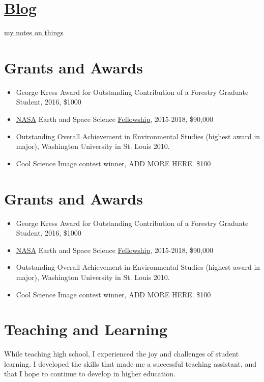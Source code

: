 \documentclass{article}
\begin{document}
\section*{\href{blog.html}{Blog}}
\label{sec:org2245daf}

\href{blog.html}{my notes on things}



\section*{Grants and Awards}
\label{sec:org26c79c4}
\begin{itemize}
\item George Kress Award for Outstanding Contribution of a Forestry Graduate
Student, 2016, \$1000
\item \href{https://www.nasa.gov/multimedia/imagegallery/iotd.html}{NASA} Earth and Space Science \href{data/NESSF15_selections.pdf}{Fellowship}, 2015-2018, \$90,000
\item Outstanding Overall Achievement in Environmental Studies (highest award in major), Washington University in St. Louis 2010.
\item Cool Science Image contest winner, ADD MORE HERE. \$100
\end{itemize}
\section*{Grants and Awards}
\label{sec:orgb8a4943}
\begin{itemize}
\item George Kress Award for Outstanding Contribution of a Forestry Graduate
Student, 2016, \$1000
\item \href{https://www.nasa.gov/multimedia/imagegallery/iotd.html}{NASA} Earth and Space Science \href{data/NESSF15_selections.pdf}{Fellowship}, 2015-2018, \$90,000
\item Outstanding Overall Achievement in Environmental Studies (highest award in major), Washington University in St. Louis 2010.
\item Cool Science Image contest winner, ADD MORE HERE. \$100
\end{itemize}
\section*{Teaching and Learning}
\label{sec:org0763903}

While teaching high school, I experienced the joy and challenges of
student learning.  I developed the skills that made me a successful
teaching assistant, and that I hope to continue to develop in higher education.
\end{document}
